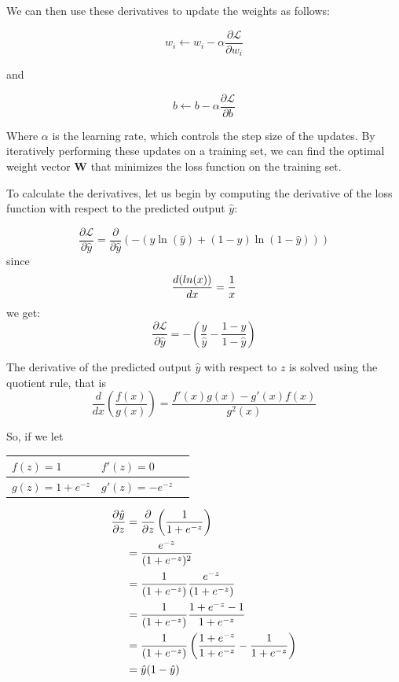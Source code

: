 		We can then use these derivatives to update the weights as follows:
		
		
		\begin{equation}
			w_i \leftarrow w_i - \alpha \frac{\partial \mathcal{L}}{\partial w_i}
		\end{equation}
		
		and
		
		\begin{equation}
			b \leftarrow b - \alpha \frac{\partial \mathcal{L}}{\partial b}
		\end{equation}
		
		
		Where $\alpha$ is the learning rate, which controls the step size of the updates. By iteratively performing these updates on a training set, we can find the optimal weight vector $\textbf{W}$ that minimizes the loss function on the training set.
		
		\bigskip
		
		To calculate the derivatives, let us begin by computing the derivative of the loss function with respect to the predicted output $\hat{y}$:
		
		
		$$
		\frac{\partial \mathcal{L}}{\partial\hat{y}} = 
		\frac{\partial}{\partial\hat{y}} 
		\left(  
		-\left(y\ln(\hat{y}) + (1-y)\ln(1-\hat{y})\right)
		\right) 
		$$
		since 
		$$\frac{d \space (ln (x))}{dx}  = \frac{1}{x}$$we get:
		$$\frac{\partial \mathcal{L}}{\partial \hat{y}} = - \left( \frac{y}{\hat{y}} - \frac{1-y}{1-\hat{y}} \right) $$
		
		The derivative of the predicted output $\hat{y}$ with respect to $z$ is solved using the quotient rule, that is 
		$$
		\frac{d}{dx} \left( \frac{f(x)}{g(x)} \right) = \frac{f'(x)g(x) - g'(x)f(x)}{g^2(x)}
		$$
		
		So, if we let
		
		\begin{table}[!ht]
			\centering
			\begin{tabular}{|l|l|l|}
				\hline
				$f(z) = 1$ & $f'(z) = 0$ \\ \hline
				$g(z)=1 +e^{-z}$ & $g'(z)= -e^{-z}$ \\ \hline
			\end{tabular}
		\end{table}
		
		
		\begin{align*}
			\frac{\partial\hat{y}}{\partial z} 
			& = \frac{\partial}{\partial z} \left( \frac{1}{1 + e^{-z}} \right) \\
			& = \frac{e^{-z}}{(1 + e^{-z})^2} \\
			& = \frac{1}{(1 + e^{-z})} \space \frac{e^{-z}}{(1 + e^{-z})} \\
			& = \frac{1}{(1 + e^{-z})} \space \frac{1 + e^{-z} -1}{1 + e^{-z}} \\
			& = \frac{1}{(1 + e^{-z})} \space \left( \frac{1 + e^{-z}}{1 + e^{-z}} - \frac{1}{1 + e^{-z}} \right)\\
			& = \hat{y}(1-\hat{y})\\
		\end{align*}
		
